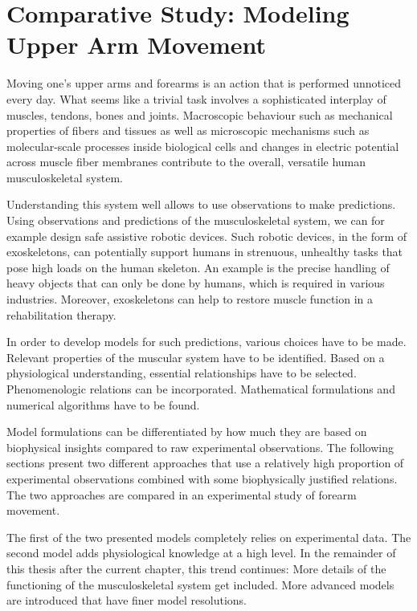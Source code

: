 
\chapter{Comparative Study: Modeling Upper Arm Movement}

Moving one's upper arms and forearms is an action that is performed unnoticed every day. 
What seems like a trivial task involves a sophisticated interplay of muscles, tendons, bones and joints. Macroscopic behaviour such as mechanical properties of fibers and tissues as well as microscopic mechanisms such as molecular-scale processes inside biological cells and changes in electric potential across muscle fiber membranes contribute to the overall, versatile human musculoskeletal system.

Understanding this system well allows to use observations to make predictions.
Using observations and predictions of the musculoskeletal system, we can for example design safe assistive robotic devices.
Such robotic devices, in the form of exoskeletons, can potentially support humans in strenuous, unhealthy tasks that pose high loads on the human skeleton. An example is the precise handling of heavy objects that can only be done by humans, which is required in various industries. Moreover, exoskeletons can help to restore muscle function in a rehabilitation therapy.

In order to develop models for such predictions, various choices have to be made. 
Relevant properties of the muscular system have to be identified. Based on a physiological understanding, essential relationships have to be selected. Phenomenologic relations can be incorporated. Mathematical formulations and numerical algorithms have to be found.

Model formulations can be differentiated by how much they are based on biophysical insights compared to raw experimental observations. The following sections present two different approaches that use a relatively high proportion of experimental observations combined with some biophysically justified relations. The two approaches are compared in an experimental study of forearm movement. 

The first of the two presented models completely relies on experimental data. The second model adds physiological knowledge at a high level. In the remainder of this thesis after the current chapter, this trend continues: More details of the functioning of the musculoskeletal system get included. More advanced models are introduced that have finer model resolutions.

